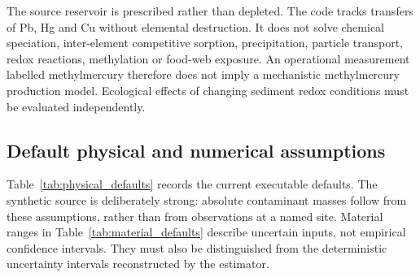 The source reservoir is prescribed rather than depleted. The code tracks transfers of Pb, Hg and Cu without elemental destruction. It does not solve chemical speciation, inter-element competitive sorption, precipitation, particle transport, redox reactions, methylation or food-web exposure. An operational measurement labelled methylmercury therefore does not imply a mechanistic methylmercury production model. Ecological effects of changing sediment redox conditions must be evaluated independently.

\subsection{Default physical and numerical assumptions}
\label{sec:default_assumptions}

Table~\ref{tab:physical_defaults} records the current executable defaults. The synthetic source is deliberately strong: absolute contaminant masses follow from these assumptions, rather than from observations at a named site. Material ranges in Table~\ref{tab:material_defaults} describe uncertain inputs, not empirical confidence intervals. They must also be distinguished from the deterministic uncertainty intervals reconstructed by the estimator.

